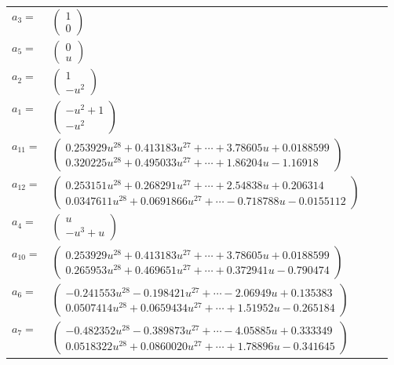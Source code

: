 \documentclass[1p]{elsarticle_modified}
\theoremstyle{definition}
\begin{document}
\begin{tabular}{m{7pt} m{180pt} m{7pt} m{180pt} }
\flushright $a_{3}=$&$\begin{pmatrix}1\\0\end{pmatrix}$ \\
\flushright $a_{5}=$&$\begin{pmatrix}0\\u\end{pmatrix}$ \\
\flushright $a_{2}=$&$\begin{pmatrix}1\\- u^2\end{pmatrix}$ \\
\flushright $a_{1}=$&$\begin{pmatrix}- u^2+1\\- u^2\end{pmatrix}$ \\
\flushright $a_{11}=$&$\begin{pmatrix}0.253929 u^{28}+0.413183 u^{27}+\cdots+3.78605 u+0.0188599\\0.320225 u^{28}+0.495033 u^{27}+\cdots+1.86204 u-1.16918\end{pmatrix}$ \\
\flushright $a_{12}=$&$\begin{pmatrix}0.253151 u^{28}+0.268291 u^{27}+\cdots+2.54838 u+0.206314\\0.0347611 u^{28}+0.0691866 u^{27}+\cdots-0.718788 u-0.0155112\end{pmatrix}$ \\
\flushright $a_{4}=$&$\begin{pmatrix}u\\- u^3+u\end{pmatrix}$ \\
\flushright $a_{10}=$&$\begin{pmatrix}0.253929 u^{28}+0.413183 u^{27}+\cdots+3.78605 u+0.0188599\\0.265953 u^{28}+0.469651 u^{27}+\cdots+0.372941 u-0.790474\end{pmatrix}$ \\
\flushright $a_{6}=$&$\begin{pmatrix}-0.241553 u^{28}-0.198421 u^{27}+\cdots-2.06949 u+0.135383\\0.0507414 u^{28}+0.0659434 u^{27}+\cdots+1.51952 u-0.265184\end{pmatrix}$ \\
\flushright $a_{7}=$&$\begin{pmatrix}-0.482352 u^{28}-0.389873 u^{27}+\cdots-4.05885 u+0.333349\\0.0518322 u^{28}+0.0860020 u^{27}+\cdots+1.78896 u-0.341645\end{pmatrix}$ \\

\end{tabular}
\end{document}
